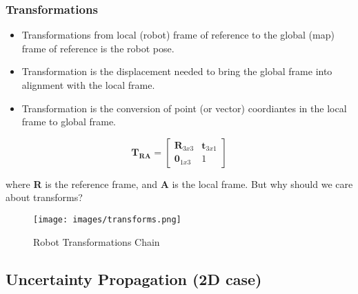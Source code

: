 \subsubsection{Transformations}
\begin{itemize}
  \item Transformations from local (robot) frame of reference to the global (map) frame of reference is the robot pose.
  \item Transformation is the displacement needed to bring the global frame into alignment with the local frame.
  \item Transformation is the conversion of point (or vector) coordiantes in the local frame to global frame.
\end{itemize}

\begin{equation}
  \mathbf{T_{RA}} =
  \begin{bmatrix}
      \mathbf{R}_{3x3} & \mathbf{t}_{3x1} \\
      \mathbf{0}_{1x3} & 1
  \end{bmatrix}
  \label{eq:Homogenous Transform matrix}
\end{equation}

where \textbf{R} is the reference frame, and \textbf{A} is the local frame.
But why should we care about transforms?

\begin{figure}[H]
  \begin{center}
    \texttt{[image: images/transforms.png]}
  \end{center}
  \caption{Robot Transformations Chain}\label{fig:Transforms}
\end{figure}

\subsection{Uncertainty Propagation (2D case)}
